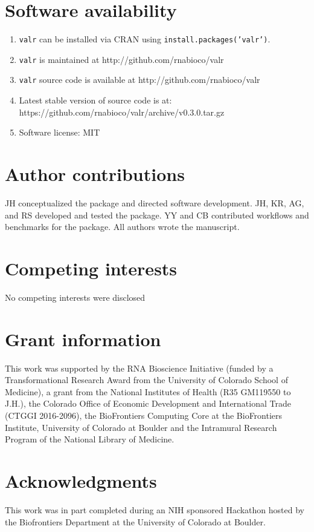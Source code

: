 \documentclass[9pt,a4paper]{extarticle}
\begin{document}
\section*{Software availability}
\begin{enumerate}
\item \texttt{valr} can be installed via CRAN using \texttt{install.packages('valr')}.
\item \texttt{valr} is maintained at http://github.com/rnabioco/valr
\item \texttt{valr} source code is available at http://github.com/rnabioco/valr
\item Latest stable version of source code is at: https://github.com/rnabioco/valr/archive/v0.3.0.tar.gz
\item Software license: MIT
\end{enumerate}

\section*{Author contributions}

JH conceptualized the package and directed software development. JH, KR, AG, and RS developed and tested the package.  YY and CB contributed workflows and benchmarks for the package. All authors wrote the manuscript.

\section*{Competing interests}
No competing interests were disclosed

\section*{Grant information}
This work was supported by the RNA Bioscience Initiative (funded by a Transformational Research Award from the University of Colorado School of Medicine),  a grant from the National Institutes of Health (R35 GM119550 to J.H.), the Colorado Office of Economic Development and International Trade (CTGGI 2016-2096), the BioFrontiers Computing Core at the BioFrontiers Institute, University of Colorado at Boulder and the Intramural Research Program of the National Library of Medicine.

\section*{Acknowledgments}
This work was in part completed during an NIH sponsored Hackathon hosted by the Biofrontiers Department at the University of Colorado at Boulder.
\end{document}
